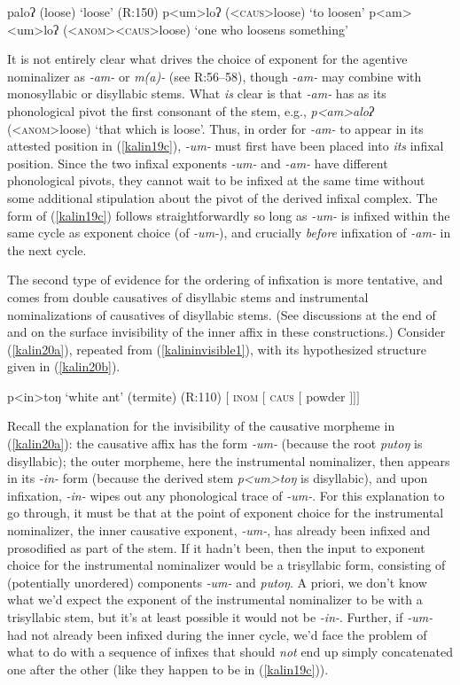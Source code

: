 \documentclass[output=paper]{langscibook}
\begin{document}
\ea
\ea paloʔ (loose) \hfill `loose' (R:150)
\ex p<um>loʔ (\textsc{<caus>}loose) \hfill `to loosen'
\ex p<am><um>loʔ (\textsc{<anom><caus>}loose) \hfill `one who loosens something'\label{kalin19c}
\z
\z

\noindent It is not entirely clear what drives the choice of exponent for the agentive nominalizer as \textit{-am-} or \textit{m(a)-} (see R:56--58), though \textit{-am-} may combine with monosyllabic or disyllabic stems. What \textit{is} clear is that \textit{-am-} has as its phonological pivot the first consonant of the stem, e.g.,  \textit{p<am>aloʔ} (\textsc{<anom>}loose) `that which is loose'. Thus, in order for \textit{-am-} to appear in its attested position in (\ref{kalin19c}), \textit{-um-} must first have been placed into \textit{its} infixal position. Since the two infixal exponents \textit{-um-} and \textit{-am-} have different phonological pivots, they cannot wait to be infixed at the same time without some additional stipulation about the pivot of the derived infixal complex. The form of (\ref{kalin19c}) follows straightforwardly so long as \textit{-um-} is infixed within the same cycle as exponent choice (of \textit{-um-}), and crucially \textit{before} infixation of \textit{-am-} in the next cycle.

The second type of evidence for the ordering of infixation  is more tentative, and comes from double causatives of disyllabic stems and instrumental nominalizations of causatives of disyllabic stems. (See discussions at the end of  and  on the surface invisibility of the inner affix in these constructions.) Consider (\ref{kalin20a}), repeated from (\ref{kalininvisible1}), with its hypothesized structure given in (\ref{kalin20b}).

\ea
\ea p<in>toŋ \hfill `white ant' (termite) (R:110)\label{kalin20a}
\ex $[$ \textsc{ inom $[$ caus} $[$ powder $]$$]$$]$\label{kalin20b}
\z
\z

\noindent Recall the explanation for the invisibility of the causative morpheme in (\ref{kalin20a}): the causative affix has the form \textit{-um-} (because the root \textit{putoŋ} is disyllabic); the outer morpheme, here the instrumental nominalizer, then appears in its \textit{-in-} form (because the derived stem \textit{p<um>toŋ} is disyllabic), and upon infixation, \textit{-in-} wipes out any phonological trace of \textit{-um-}. For this explanation to go through, it must be that at the point of exponent choice for the instrumental nominalizer, the inner causative exponent, \textit{-um-}, has already been infixed and prosodified as part of the stem. If it hadn't been, then the input to exponent choice for the instrumental nominalizer would be a trisyllabic form, consisting of (potentially unordered) components \textit{-um-} and  \textit{putoŋ}. A priori, we don't know what we'd expect the exponent of the instrumental nominalizer to be with a trisyllabic stem, but it's at least possible it would not be \textit{-in-}. Further, if \textit{-um-} had not already been infixed during the inner cycle, we'd face the problem of what to do with a sequence of infixes that should \textit{not} end up simply concatenated one after the other (like they happen to be in (\ref{kalin19c})).
\end{document}
